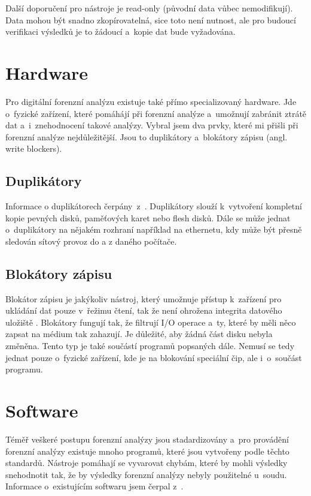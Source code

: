 \documentclass[thesis=B,czech]{FITthesis}[2012/06/26]
\begin{document}
Další doporučení pro nástroje je read-only (původní data vůbec nemodifikují). Data mohou být snadno zkopírovatelná, sice toto není nutnost, ale pro budoucí verifikaci výsledků je to žádoucí a~kopie dat bude vyžadována. 


\section{Hardware}
Pro digitální forenzní analýzu existuje také přímo specializovaný hardware. Jde o~fyzické zařízení, které pomáhájí při forenzní analýze a~umožnují zabránit ztrátě dat a~i~znehodnocení takové analýzy. Vybral jsem dva prvky, které mi přišli při forenzní analýze nejdůležitější. Jsou to duplikátory a~blokátory zápisu (angl. write blockers).

\subsection{Duplikátory}
\label{duplikatory}
Informace o duplikátorech čerpány~z~\cite{for_hard}. Duplikátory slouží k~vytvoření kompletní kopie pevných disků, paměťových karet nebo flesh disků. Dále se může jednat o~duplikátory na nějakém rozhraní například na ethernetu, kdy může být přesně sledován sítový provoz do a z daného počítače.
\subsection{Blokátory zápisu}
\label{blokatory}
Blokátor zápisu je jakýkoliv nástroj, který umožnuje přístup k~zařízení pro ukládání dat pouze v~řežimu čtení, tak že není ohrožena integrita datového uložiště \cite{for_hard2}. Blokátory fungují tak, že filtrují I/O operace a~ty, které by měli něco zapsat na médium tak zahazují. Je důležité, aby žádná část disku nebyla změněna. Tento typ je také součástí programů popsaných dále. Nemusí se tedy jednat pouze o~fyzické zařízení, kde je na blokování speciální čip, ale i~o~součást programu.

\section{Software}

Téměř veškeré postupu forenzní analýzy jsou stadardizovány a~pro provádění forenzní analýzy existuje mnoho programů, které jsou vytvořeny podle těchto standardů. Nástroje pomáhají se vyvarovat chybám, které by mohli výsledky snehodnotit tak, že by výsledky forenzní analýzy nebyly použitelné u~soudu. Informace o~existujícím softwaru jsem čerpal z~\cite{for_soft}.
\end{document}
